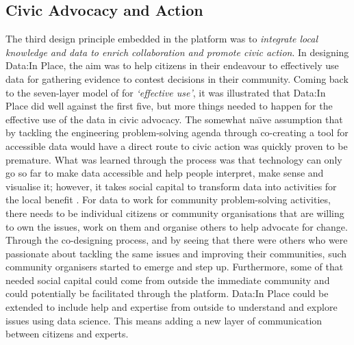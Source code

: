 \subsection{Civic Advocacy and Action}
The third design principle embedded in the platform was to \textit{integrate local knowledge and data to enrich collaboration and promote civic action}. In designing Data:In Place, the aim was to help citizens in their endeavour to effectively use data for gathering evidence to contest decisions in their community. Coming back to the seven-layer model of \citet{gurstein_open_2011} for \textit{`effective use'}, it was illustrated that Data:In Place did well against the first five, but more things needed to happen for the effective use of the data in civic advocacy. The somewhat na{\"\i}ve assumption that by tackling the engineering problem-solving agenda through co-creating a tool for accessible data would have a direct route to civic action was quickly proven to be premature. What was learned through the process was that technology can only go so far to make data accessible and help people interpret, make sense and visualise it; however, it takes social capital to transform data into activities for the local benefit \citep{gurstein_open_2011}. For data to work for community problem-solving activities, there needs to be individual citizens or community organisations that are willing to own the issues, work on them and organise others to help advocate for change. Through the co-designing process, and by seeing that there were others who were passionate about tackling the same issues and improving their communities, such community organisers started to emerge and step up. Furthermore, some of that needed social capital could come from outside the immediate community and could potentially be facilitated through the platform. Data:In Place could be extended to include help and expertise from outside to understand and explore issues using data science. This means adding a new layer of communication between citizens and experts.

